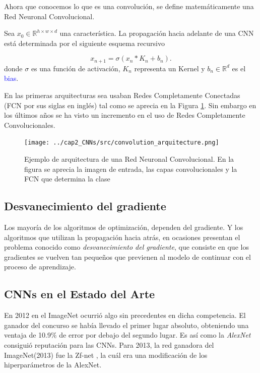 Ahora que conocemos lo que es una convolución, se define matemáticamente una Red Neuronal Convolucional.   
\begin{definition} 
    Sea $x_0\in \mathbb R^{h\times w\times d}$ una característica. La propagación hacia adelante de una CNN está determinada por el siguiente esquema recursivo

    \begin{equation}
        x_{n+1} = \sigma(x_n * K_n + b_n).
    \end{equation}
    donde $\sigma$ es una función de activación, $K_n$ representa un Kernel y $b_n\in \mathbb R^d$ es el \textcolor{blue}{bias}.
\end{definition}
En las primeras arquitecturas sea usaban Redes Completamente Conectadas (FCN por sus siglas en inglés) tal como se aprecia en la Figura \ref{cnn_example_img}. Sin embargo en los últimos años se ha visto un incremento en el uso de Redes Completamente Convolucionales.

\begin{figure}[H]
    \centering
    
    \texttt{[image: ../cap2\_CNNs/src/convolution\_arquitecture.png]}
    \caption{\label{cnn_example_img} Ejemplo de arquitectura de una Red Neuronal Convolucional. En la figura se aprecia la imagen de entrada, las capas convolucionales y la FCN que determina la clase \cite{image:cnn}} 

\end{figure}


\subsection{Desvanecimiento del gradiente}
Los mayoría de los algoritmos de optimización, dependen del gradiente. Y los algoritmos que utilizan la propagación hacia atrás, en ocasiones presentan el problema conocido como \textsl{desvanecimiento del gradiente}, que consiste en que los gradientes se vuelven tan pequeños que previenen al modelo de continuar con el proceso de aprendizaje.

\subsection{CNNs en el Estado del Arte}
En 2012 en el ImageNet ocurrió algo sin precedentes en dicha competencia. El ganador del concurso se había llevado el primer lugar absoluto, obteniendo una ventaja de 10.9$\%$ de error por debajo del segundo lugar. Es así como la \textsl{AlexNet} \cite{alexnet} consiguió reputación para las CNNs. Para 2013, la red ganadora del ImageNet(2013) fue la Zf-net \cite{zfnet}, la cuál era una modificación de los hiperparámetros de la AlexNet.

